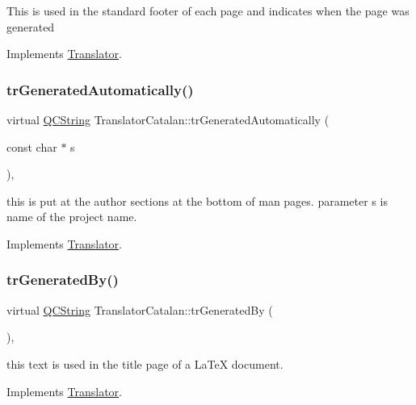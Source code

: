 This is used in the standard footer of each page and indicates when the page was generated 

Implements \mbox{\hyperlink{class_translator}{Translator}}.

\mbox{\label{class_translator_catalan_a80254dfe5544fbacd667cc71988badcf}} 
\subsubsection{\texorpdfstring{trGeneratedAutomatically()}{trGeneratedAutomatically()}}
{\footnotesize\ttfamily virtual \mbox{\hyperlink{class_q_c_string}{Q\+C\+String}} Translator\+Catalan\+::tr\+Generated\+Automatically (\begin{DoxyParamCaption}\item[{const char $\ast$}]{s }\end{DoxyParamCaption})\hspace{0.3cm}{\ttfamily [inline]}, {\ttfamily [virtual]}}

this is put at the author sections at the bottom of man pages. parameter s is name of the project name. 

Implements \mbox{\hyperlink{class_translator}{Translator}}.

\mbox{\label{class_translator_catalan_a54025f130125a0e3319d106cbb96019c}} 
\subsubsection{\texorpdfstring{trGeneratedBy()}{trGeneratedBy()}}
{\footnotesize\ttfamily virtual \mbox{\hyperlink{class_q_c_string}{Q\+C\+String}} Translator\+Catalan\+::tr\+Generated\+By (\begin{DoxyParamCaption}{ }\end{DoxyParamCaption})\hspace{0.3cm}{\ttfamily [inline]}, {\ttfamily [virtual]}}

this text is used in the title page of a La\+TeX document. 

Implements \mbox{\hyperlink{class_translator}{Translator}}.

